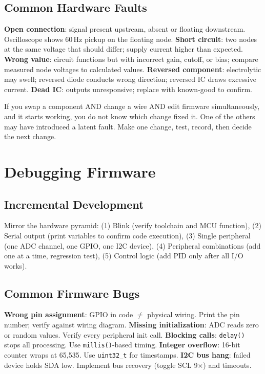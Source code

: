 \documentclass[11pt,letterpaper,twoside,openany]{book}
\begin{document}
\subsection{Common Hardware Faults}
\textbf{Open connection}: signal present upstream, absent or floating downstream. Oscilloscope shows 60\,Hz pickup on the floating node. \textbf{Short circuit}: two nodes at the same voltage that should differ; supply current higher than expected. \textbf{Wrong value}: circuit functions but with incorrect gain, cutoff, or bias; compare measured node voltages to calculated values. \textbf{Reversed component}: electrolytic may swell; reversed diode conducts wrong direction; reversed IC draws excessive current. \textbf{Dead IC}: outputs unresponsive; replace with known-good to confirm.

\begin{warningbox}
If you swap a component AND change a wire AND edit firmware simultaneously, and it starts working, you do not know which change fixed it. One of the others may have introduced a latent fault. Make one change, test, record, then decide the next change.
\end{warningbox}

\section{Debugging Firmware}

\subsection{Incremental Development}
Mirror the hardware pyramid: (1) Blink (verify toolchain and MCU function), (2) Serial output (print variables to confirm code execution), (3) Single peripheral (one ADC channel, one GPIO, one I2C device), (4) Peripheral combinations (add one at a time, regression test), (5) Control logic (add PID only after all I/O works).

\subsection{Common Firmware Bugs}
\textbf{Wrong pin assignment}: GPIO in code $\neq$ physical wiring. Print the pin number; verify against wiring diagram. \textbf{Missing initialization}: ADC reads zero or random values. Verify every peripheral init call. \textbf{Blocking calls}: \texttt{delay()} stops all processing. Use \texttt{millis()}-based timing. \textbf{Integer overflow}: 16-bit counter wraps at 65,535. Use \texttt{uint32\_t} for timestamps. \textbf{I2C bus hang}: failed device holds SDA low. Implement bus recovery (toggle SCL 9$\times$) and timeouts.
\end{document}
